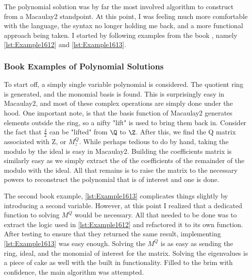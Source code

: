 The polynomial solution was by far the most involved algorithm to construct from a Macaulay2 standpoint. At this point, I was feeling much more comfortable with the language, the syntax no longer holding me back, and a more functional approach being taken. I started by following examples from the book \cite{Applied}, namely \ref{lst:Example1612} and \ref{lst:Example1613}. 

\subsubsection{Book Examples of Polynomial Solutions}
To start off, a simply single variable polynomial is considered. The quotient ring is generated, and the monomial basis is found. This is surprisingly easy in Macaulay2, and most of these complex operations are simply done under the hood. One important note, is that the basis function of Macaulay2 generates elements outside the ring, so a nifty "lift" is used to bring them back in. Consider the fact that $\frac{4}{2}$ can be "lifted" from $\Q$ to $\Z$. After this, we find the Q matrix associated with Z, or $M_z^Q$. While perhaps tedious to do by hand, taking the modulo by the ideal is easy in Macaulay2. Building the coefficients matrix is similarly easy as we simply extract the of the coefficients of the remainder of the modulo with the ideal. All that remains is to raise the matrix to the necessary powers to reconstruct the polynomial that is of interest and one is done. 

The second book example, \ref{lst:Example1613} complicates things slightly by introducing a second variable. However, at this point I realized that a dedicated function to solving $M^Q$ would be necessary. All that needed to be done was to extract the logic used in \ref{lst:Example1612} and refactored it to its own function. After testing to ensure that they returned the same result, implementing \ref{lst:Example1613} was easy enough. Solving the $M^Q$ is as easy as sending the ring, ideal, and the monomial of interest for the matrix. Solving the eigenvalues is a piece of cake as well with the built in functionality. Filled to the brim with confidence, the main algorithm was attempted. 

